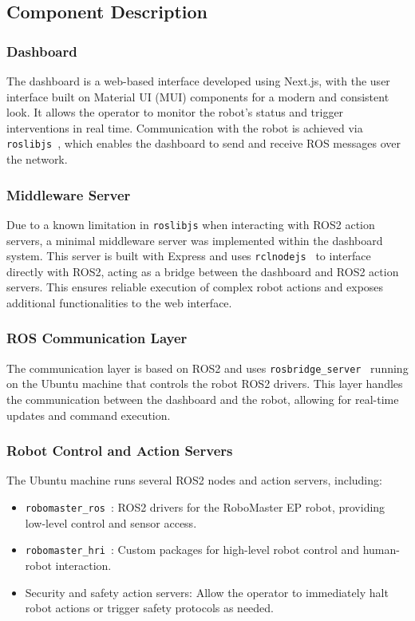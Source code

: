 \documentclass[a4paper]{usiinfbachelorproject}
\begin{document}
\subsection{\textbf{Component Description}}
\subsubsection*{\textbf{Dashboard}}
The dashboard is a web-based interface developed using Next.js, with the user interface built on Material UI (MUI) components for a modern and consistent look.
It allows the operator to monitor the robot's status and trigger interventions in real time. Communication with the robot is achieved via \texttt{roslibjs}~\cite{roslibjs}, which enables the dashboard to send and receive ROS messages over the network.

\subsubsection*{\textbf{Middleware Server}}
Due to a known limitation in \texttt{roslibjs} when interacting with ROS2 action servers, a minimal middleware server was implemented within the dashboard system.
This server is built with Express and uses \texttt{rclnodejs}~\cite{rclnodejs} to interface directly with ROS2, acting as a bridge between the dashboard and ROS2 action servers.
This ensures reliable execution of complex robot actions and exposes additional functionalities to the web interface.

\subsubsection*{\textbf{ROS Communication Layer}}
The communication layer is based on ROS2 and uses \texttt{rosbridge\_server}~\cite{rosbridge} running on the Ubuntu machine that controls the robot ROS2 drivers.
This layer handles the communication between the dashboard and the robot, allowing for real-time updates and command execution.

\subsubsection*{\textbf{Robot Control and Action Servers}}
The Ubuntu machine runs several ROS2 nodes and action servers, including:
\begin{itemize}
    \item \texttt{robomaster\_ros}~\cite{frovaaa2025robomaster}: ROS2 drivers for the RoboMaster EP robot, providing low-level control and sensor access.
    \item \texttt{robomaster\_hri}~\cite{frovaaa2025robomasterhri}: Custom packages for high-level robot control and human-robot interaction.
    \item Security and safety action servers: Allow the operator to immediately halt robot actions or trigger safety protocols as needed.
\end{itemize}
\end{document}
